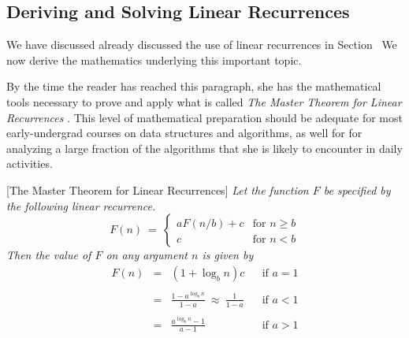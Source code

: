 \documentclass{article}
\begin{document}
\subsection{Deriving and Solving Linear Recurrences}
\label{sec:linear-recurrences-2}

We have discussed already discussed the use of linear recurrences in
Section~%
 We now derive the mathematics
underlying this important topic.

By the time the reader has reached this paragraph, she has the
mathematical tools necessary to prove and apply what is called {\it
  The Master Theorem for Linear Recurrences} \cite{CLRS}.  This level
of mathematical preparation should be adequate for most
early-undergrad courses on data structures and algorithms, as well for
for analyzing a large fraction of the algorithms that she is likely to
encounter in daily activities.

[The Master Theorem for Linear Recurrences]
\label{thm:master-thm}
{\it 
Let the function $F$ be specified by the following linear recurrence.}
\begin{equation}
\label{eq:Lin-Recur:start}
F(n) \ = \ \left\{
\begin{array}{cl}
a F(n/b) + c & \mbox{for } n \geq b \\
c & \mbox{for } n < b
\end{array}
\right.
\end{equation}
{\it
Then the value of $F$ on any argument $n$ is given by}
\begin{equation}
\label{eq:Lin-Recur:solve}
\begin{array}{lclll}
F(n) & = & (1 + \log_b n)c &  & \mbox{if } a=1 \\
     &   &                 &  & \\
     & = &
  {\displaystyle
  \frac{1-a^{\log_b n}}{1-a} \ \approx \ \frac{1}{1-a}
  }
 &  & \mbox{if } a<1 \\
    &   &                  & & \\
    & = &
  {\displaystyle
\frac{a^{\log_b n} -1}{a-1}
  }
 & & \mbox{if } a>1
\end{array}
\end{equation}
\end{document}
